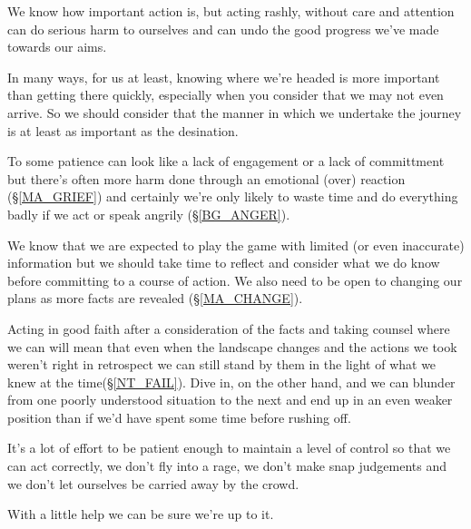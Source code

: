 \cleardoublepage
{ \small
We know how important action is, but acting rashly, without care and attention can do serious harm to ourselves and can undo the good progress we've made towards our aims.

In many ways, for us at least, knowing where we're headed is more important than getting there quickly, especially when you consider that we may not even arrive. So we should consider that the manner in which we undertake the journey is at least as important as the desination.

To some patience can look like a lack of engagement or a lack of committment but there's often more harm done through an emotional (over) reaction (\S \ref{MA_GRIEF}) and certainly we're only likely to waste time and do everything badly if we act or speak angrily (\S \ref{BG_ANGER}).

We know that we are expected to play the game with limited (or even inaccurate) information but we should take time to reflect and consider what we do know before committing to a course of action. We also need to be open to changing our plans as more facts are revealed (\S \ref{MA_CHANGE}).  

Acting in good faith after a consideration of the facts and taking counsel where we can will mean that even when the landscape changes and the actions we took weren't right in retrospect we can still stand by them in the light of what we knew at the time(\S \ref{NT_FAIL}). Dive in, on the other hand, and we can blunder from one poorly understood situation to the next and end up in an even weaker position than if we'd have spent some time before rushing off. 

It's a lot of effort to be patient enough to maintain a level of control so that we can act correctly, we don't fly into a rage, we don't make snap judgements and we don't let ourselves be carried away by the crowd.

With a little help we can be sure we're up to it.
}

